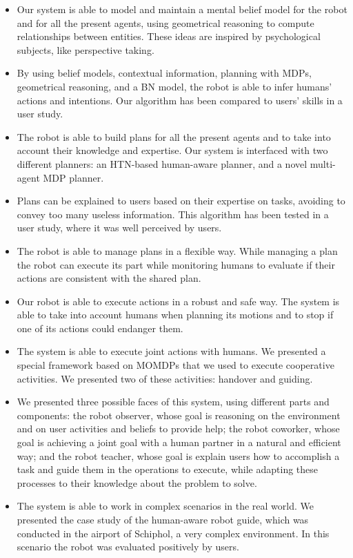 \begin{itemize}
\item Our system is able to model and maintain a mental belief model for the robot and for all the present agents, using geometrical reasoning to compute relationships between entities. These ideas are inspired by psychological subjects, like perspective taking.
\item By using belief models, contextual information, planning with MDPs,  geometrical reasoning, and a BN model, the robot is able to infer humans' actions and intentions. Our algorithm has been compared to users' skills in a user study.
\item The robot is able to build plans for all the present agents and to take into account their knowledge and expertise. Our system is interfaced with two different planners: an HTN-based human-aware planner, and a novel multi-agent MDP planner.
\item Plans can be explained to users based on their expertise on tasks, avoiding to convey too many useless information. This algorithm has been tested in a user study, where it was well perceived by users.
\item The robot is able to manage plans in a flexible way. While managing a plan the robot can execute its part while monitoring humans to evaluate if their actions are consistent with the shared plan.
\item Our robot is able to execute actions in a robust and safe way. The system is able to take into account humans when planning its motions and to stop if one of its actions could endanger them.
\item The system is able to execute joint actions with humans. We presented a special framework based on MOMDPs that we used to execute cooperative activities. We presented two of these activities: handover and guiding.
\item We presented three possible faces of this system, using different parts and components: the robot observer, whose goal is reasoning on the environment and on user activities and beliefs to provide help; the robot coworker, whose goal is achieving a joint goal with a human partner in a natural and efficient way; and the robot teacher, whose goal is explain users how to accomplish a task and guide them in the operations to execute, while adapting these processes to their knowledge about the problem to solve. 
\item The system is able to work in complex scenarios in the real world. We presented the case study of the human-aware robot guide, which was conducted in the airport of Schiphol, a very complex environment. In this scenario the robot was evaluated positively by users.
\end{itemize}


